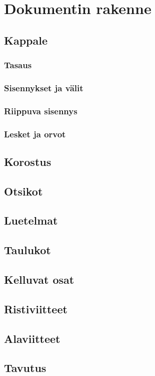 \documentclass[notitlepage,oneside]{book}
\begin{document}




\chapter{Dokumentin rakenne}
\section{Kappale}
\label{luku:kappale}

\subsection{Tasaus}
\subsection{Sisennykset ja välit}
\subsection{Riippuva sisennys}
\subsection{Lesket ja orvot}
\section{Korostus}
\section{Otsikot}
\section{Luetelmat}
\section{Taulukot}
\label{luku:taulukot}
\section{Kelluvat osat}
\section{Ristiviitteet}
\section{Alaviitteet}
\section{Tavutus}
\end{document}
